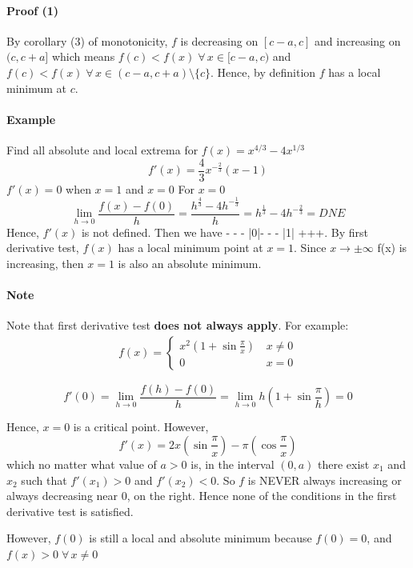 \documentclass[12pt]{article}
\begin{document}
\paragraph{Proof (1)}
By corollary (3) of monotonicity, $f$ is decreasing on $[c - a, c]$ and increasing on 
$(c, c + a]$ which means $f(c) < f(x) \; \forall \, x \in [c - a, c)$ and $f(c) < f(x) \; \forall
\, x \in (c - a, c + a) \setminus\{c\}$. Hence, by definition $f$ has a local minimum at $c$.

\paragraph{Example}
Find all absolute and local extrema for $f(x) = x^{4/3} - 4x^{1/3}$
\[
    f'(x) = \frac{4}{3}x^{ - \frac{2}{3}}(x - 1)
\]
$f'(x) = 0$ when $x = 1$ and $x = 0$
For $x = 0$
\[
    \lim_{h \to 0} \frac{f(x) - f(0)}{h} = \frac{h^{\frac{4}{3}} - 4h^{ - \frac{1}{3}}}{h} = h^{\frac{1}{3}} - 4h^{ - \frac{2}{3}} = DNE 
\]
Hence, $f'(x)$ is not defined.
Then we have - - - |0|- - - |1| +++. By first derivative test, $f(x)$ has a local minimum point at $x = 1$. Since $x \to \pm \infty$ f(x) is increasing,
then $x = 1$ is also an absolute minimum.

\paragraph{Note}
Note that first derivative test \textbf{does not always apply}. For example:
\begin{align*} 
    f(x) = 
    \begin{cases} 
        x^2(1 + \sin \frac{\pi}{x})\, & x \neq 0 \\
        0 & x = 0
    \end{cases} 
\end{align*}

\[
    f'(0) = \lim_{h \to 0} \frac{f(h) - f(0)}{h} =  \lim_{h \to 0} h(1 + \sin \frac{\pi}{h}) = 0
\]

Hence, $x = 0$ is a critical point. However,
\[
    f'(x) = 2x(\sin \frac{\pi}{x}) - \pi (\cos \frac{\pi}{x})
\]
which no matter what value of $a > 0$ is, in the interval $(0, a)$ there exist $x_1$ and $x_2$ such that 
$f'(x_1) > 0$ and $f'(x_2) < 0$. So $f$ is NEVER always increasing or always decreasing near 0, on the right. 
Hence none of the conditions in the first derivative test is satisfied.

However, $f(0)$ is still a local and absolute minimum because $f(0) = 0$, and $f(x) > 0 \; \forall \, x \neq 0$
\end{document}
